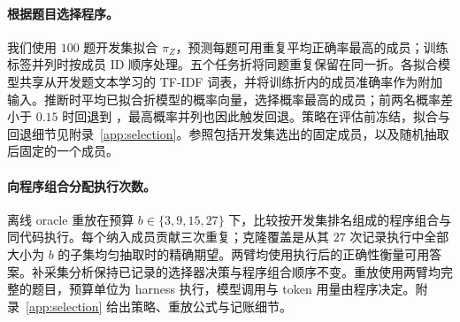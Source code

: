 \paragraph{根据题目选择程序。}
我们使用 $100$ 题开发集拟合 $\pi_Z$，预测每题可用重复平均正确率最高的成员；训练标签并列时按成员 ID 顺序处理。五个任务折将同题重复保留在同一折。各拟合模型共享从开发题文本学习的 TF-IDF 词表，并将训练折内的成员准确率作为附加输入。推断时平均已拟合折模型的概率向量，选择概率最高的成员；前两名概率差小于 $0.15$ 时回退到 \bare{}，最高概率并列也因此触发回退。策略在评估前冻结，拟合与回退细节见附录~\ref{app:selection}。参照包括开发集选出的固定成员，以及随机抽取后固定的一个成员。

\paragraph{向程序组合分配执行次数。}
离线 oracle 重放在预算 $b\in\{3,9,15,27\}$ 下，比较按开发集排名组成的程序组合与同代码执行。每个纳入成员贡献三次重复；克隆覆盖是从其 $27$ 次记录执行中全部大小为 $b$ 的子集均匀抽取时的精确期望。两臂均使用执行后的正确性衡量可用答案。补采集分析保持已记录的选择器决策与程序组合顺序不变。重放使用两臂均完整的题目，预算单位为 harness 执行，模型调用与 token 用量由程序决定。附录~\ref{app:selection} 给出策略、重放公式与记账细节。
